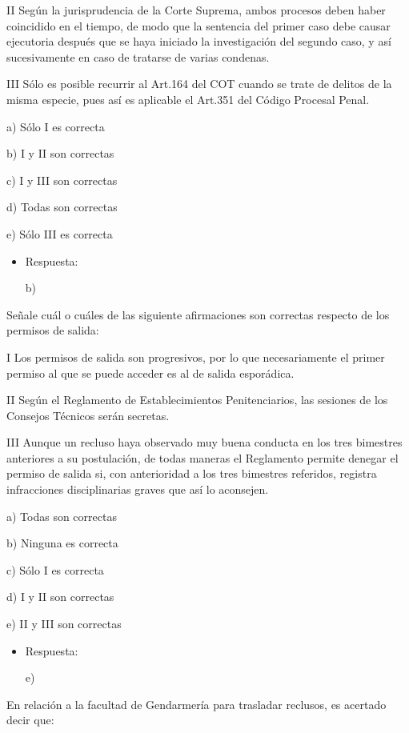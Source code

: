 \documentclass[letterpaper, 11pt]{article}
\begin{document}
II Según la jurisprudencia de la Corte Suprema, ambos procesos deben
haber coincidido en el tiempo, de modo que la sentencia del primer
caso debe causar ejecutoria después que se haya iniciado la
investigación del segundo caso, y así sucesivamente en caso de
tratarse de varias condenas.

III Sólo es posible recurrir al Art.164 del COT cuando se trate de
delitos de la misma especie, pues así es aplicable el Art.351 del
Código Procesal Penal.

a) Sólo I es correcta

b) I y II son correctas

c) I y III son correctas

d) Todas son correctas

e) Sólo III es correcta

\begin{itemize}
\item Respuesta:

b)
\end{itemize}


Señale cuál o cuáles de las siguiente afirmaciones son correctas
respecto de los permisos de salida:

I Los permisos de salida son progresivos, por lo que necesariamente el
primer permiso al que se puede acceder es al de salida esporádica.

II Según el Reglamento de Establecimientos Penitenciarios, las
sesiones de los Consejos Técnicos serán secretas.

III Aunque un recluso haya observado muy buena conducta en los tres
bimestres anteriores a su postulación, de todas maneras el Reglamento
permite denegar el permiso de salida si, con anterioridad a los tres
bimestres referidos, registra infracciones disciplinarias graves que
así lo aconsejen.

a) Todas son correctas

b) Ninguna es correcta

c) Sólo I es correcta

d) I y II son correctas

e) II y III son correctas

\begin{itemize}
\item Respuesta:

e)
\end{itemize}


En relación a la facultad de Gendarmería para trasladar reclusos, es
acertado decir que:
\end{document}
